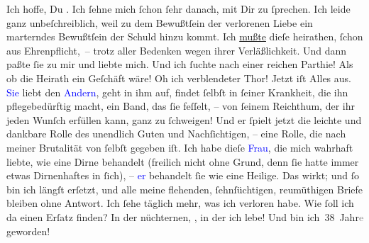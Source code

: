 \pstart
           Ich hoffe, Du \label{K_L03362-2v}\label{K_L03362-2h}. Ich ſehne mich ſchon ſehr danach, mit Dir zu ſprechen. Ich leide {\pb}ganz unbeſchreiblich, weil zu dem Bewußtſein der
               verlorenen Liebe ein marterndes Bewußtſein der Schuld hinzu kommt. Ich \uline{mußte} dieſe \label{K_L03362-3v}\label{K_L03362-3h} heirathen, ſchon aus Ehrenpflicht, – trotz aller Bedenken wegen ihrer
               Verläßlichkeit. Und dann paßte ſie zu mir und liebte mich. Und ich ſuchte nach einer
               reichen Parthie! Als ob die Heirath ein Geſchäft wäre! Oh ich verblendeter Thor!
               Jetzt iſt {\pb}Alles aus. \textcolor{blue}{Sie}{}\ledrightnote{{$\rightarrow$}\textcolor{blue}{Theodore Rottenberg}} liebt den \textcolor{blue}{Andern}{}\ledrightnote{{$\rightarrow$}\textcolor{blue}{?? [Partner von Theodore Rottenberg, Ende 1902/Anfang 1903]}}, geht in ihm auf, findet ſelbſt in
               ſeiner Krankheit, die ihn pflegebedürftig macht, ein \strikeout{\textcolor{gray}{w}} Band, das ſie feſſelt, – von ſeinem Reichthum, der ihr jeden Wunſch erfüllen
               kann, ganz zu ſchweigen! Und er ſpielt  jetzt die
               leichte und dankbare Rolle des unendlich Guten und Nachſichtigen, – eine Rolle, die
               nach meiner Brutalität von ſelbſt gegeben iſt. Ich habe dieſe \textcolor{blue}{Frau}{}\ledrightnote{{$\rightarrow$}\textcolor{blue}{Theodore Rottenberg}}, die mich wahrhaft liebte, wie eine
                  {\pb}Dirne behandelt (freilich nicht ohne Grund, denn
               ſie hatte immer etwas Dirnenhaftes in ſich), – \textcolor{blue}{er}{}\ledrightnote{{$\rightarrow$}\textcolor{blue}{?? [Partner von Theodore Rottenberg, Ende 1902/Anfang 1903]}} behandelt ſie wie eine
               Heilige. Das wirkt; und ſo bin ich längſt erſetzt, und alle meine flehenden,
               ſehnſüchtigen, reumüthigen Briefe bleiben ohne Antwort. Ich ſehe täglich mehr, was
               ich verloren habe. Wie ſoll ich da einen Erſatz finden? In der nüchternen, \label{K_L03362-4v}\label{K_L03362-4h}, in der ich lebe! Und \label{K_L03362-5v}\label{K_L03362-5h} bin ich 38 Jahr\textcolor{gray}{e} geworden!\pend
           
